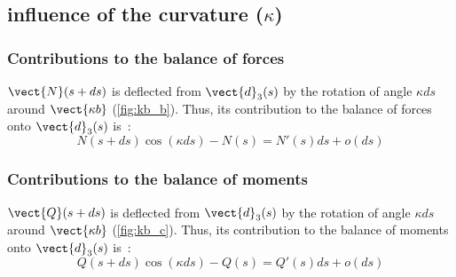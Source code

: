 \clearpage
\subsection{influence of the curvature ($\kappa$)}
\subsubsection{Contributions to the balance of forces}
$\vect{N}(s+ds)$ is deflected from $\vect{d}_3(s)$ by the rotation of angle $\kappa ds$ around $\vect{\kappa b}$ (\cref{fig:kb_b}). Thus, its contribution to the balance of forces onto $\vect{d}_3(s)$ is~:
\begin{equation*}
	N(s+ds) \cos(\kappa ds) - N(s) = N'(s) ds + o(ds)
\end{equation*}

\subsubsection{Contributions to the balance of moments}
$\vect{Q}(s+ds)$ is deflected from $\vect{d}_3(s)$ by the rotation of angle $\kappa ds$ around $\vect{\kappa b}$ (\cref{fig:kb_c}). Thus, its contribution to the balance of moments onto $\vect{d}_3(s)$ is~:
\begin{equation*}
	Q(s+ds) \cos(\kappa ds) - Q(s) = Q'(s) ds + o(ds)
\end{equation*}


